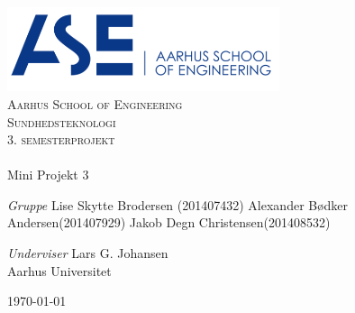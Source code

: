 \begin{titlingpage}
\begin{center}

~ \\[3cm]


\includegraphics[width=0.6\textwidth]{Figur/ASE}\\[1cm]

\textsc{\LARGE Aarhus School of Engineering}\\[1.5cm]

\textsc{\Large Sundhedsteknologi}\\
\textsc{\Large 3. semesterprojekt}\\[0.5cm]

\noindent\makebox[\linewidth]{\rule{\textwidth}{0.4pt}}\\
[0.5cm]{\Huge Mini Projekt 3}
\noindent\makebox[\linewidth]{\rule{\textwidth}{0.4pt}}

\end{center}

\textit{Gruppe} \newline
Lise Skytte Brodersen (201407432) \newline
Alexander Bødker Andersen(201407929) \newline
Jakob Degn Christensen(201408532) \newline




\textit{Underviser} \newline
Lars G. Johansen\\
Aarhus Universitet


\vfill

\begin{center}
{\large \today}
\end{center}


\end{titlingpage}